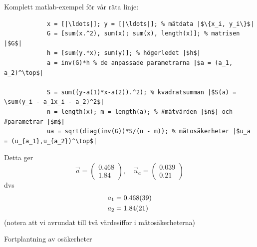\documentclass[9pt]{beamer}
\begin{document}
    \begin{frame}[fragile]
        Komplett matlab-exempel för vår räta linje:

        \begin{verbatim}
            x = [|\ldots|]; y = [|\ldots|]; % mätdata |$\{x_i, y_i\}$|
            G = [sum(x.^2), sum(x); sum(x), length(x)]; % matrisen |$G$|
            h = [sum(y.*x); sum(y)]; % högerledet |$h$|
            a = inv(G)*h % de anpassade parametrarna |$a = (a_1, a_2)^\top$|

            S = sum((y-a(1)*x-a(2)).^2); % kvadratsumman |$S(a) = \sum(y_i - a_1x_i - a_2)^2$|
            n = length(x); m = length(a); % #mätvärden |$n$| och #parametrar |$m$|
            ua = sqrt(diag(inv(G))*S/(n - m)); % mätosäkerheter |$u_a = (u_{a_1},u_{a_2})^\top$|
        \end{verbatim}

        \vfill
        Detta ger
        \begin{equation*}
            \vec a =
            \begin{pmatrix}
                0.468 \\
                1.84
            \end{pmatrix},\quad
            \vec u_a =
            \begin{pmatrix}
                0.039 \\
                0.21
            \end{pmatrix}
        \end{equation*}
        dvs
        \begin{align*}
            a_1 &= \num{0.468\pm0.039} \\
            a_2 &= \num{1.84\pm0.21}
        \end{align*}
        (notera att vi avrundat till två värdesiffor i mätosäkerheterna)
    \end{frame}

    \begin{frame}
        \begin{center}
            \huge{Fortplantning av osäkerheter}
        \end{center}
        
    \end{frame}
\end{document}
